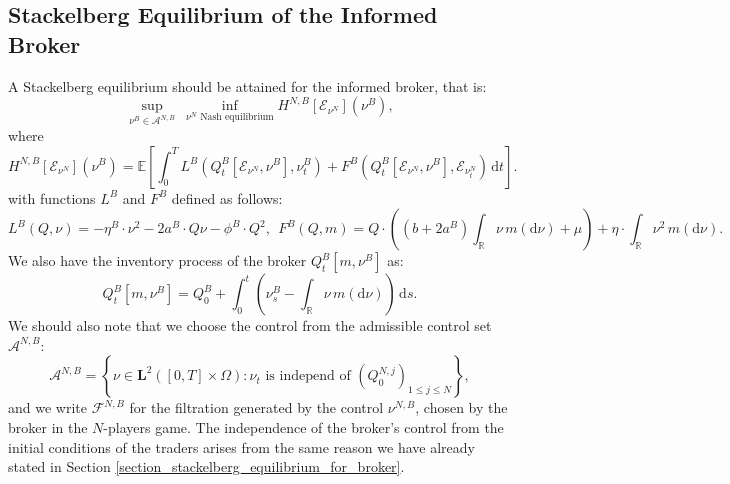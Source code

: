 \documentclass[10pt]{article}
\begin{document}
\subsection{Stackelberg Equilibrium of the Informed Broker}\label{section: broker_finite_problem}
A Stackelberg equilibrium should be attained for the informed broker, that is:
\begin{equation}\label{lem.finite_problem_for_broker}
    \underset{\nu^B \in \mathcal{A}^{N,B}}{\sup} ~\underset{\nu^N \text{~Nash equilibrium}}{\inf} H^{N,B}\left[\mathcal{E}_{\nu^N}\right] \left(\nu^B\right),
\end{equation}
where
\begin{equation}\label{broker_obj_finite}
    H^{N,B}\left[\mathcal{E}_{\nu^N}\right]\left(\nu^B\right) = \mathbb{E} \left[ \int_0^T L^B(Q^B_t[\mathcal{E}_{\nu^N}, \nu^B], \nu^B_t) + F^B(Q^B_t[\mathcal{E}_{\nu^N}, \nu^B], \mathcal{E}_{\nu_t^N}) \, \mathrm{d}t \right].
\end{equation}
with functions $L^B$ and $F^B$ defined as follows:
\[
    L^B(Q, \nu) = - \eta^B \cdot \nu^2 - 2a^B \cdot Q \nu - \phi^B \cdot Q^2,~~
    F^B(Q, m) = Q \cdot \left( (b + 2a^B) \int_{\mathbb{R}} \nu \, m(\mathrm{d} \nu) + \mu\right) + \eta \cdot \int_{\mathbb{R}} \nu^2 \, m(\mathrm{d} \nu).
\]
We also have the inventory process of the broker $Q^B_t[m,\nu^B]$ as:
\[
    Q^B_t[m,\nu^B] = Q_0^B + \int_0^t \left( \nu_s^B - \int_{\mathbb{R}} \nu \, m(\mathrm{d}\nu) \right) \, \mathrm{d}s.
\]
We should also note that we choose the control from the admissible control set $\mathcal{A}^{N,B}$:
\[
    \mathcal{A}^{N,B} = \left\{ \nu \in \mathbf{L}^2([0,T] \times \Omega): \nu_t \text{ is independ of }(Q_0^{N,j})_{1\leq j \leq N} \right\},
\]
and we write \( \mathcal{F}^{N,B} \) for the filtration generated by the control \( \nu^{N,B} \), chosen by the broker in the \( N \)-players game. The independence of the broker's control from the initial conditions of the traders arises from the same reason we have already stated in Section \ref{section_stackelberg_equilibrium_for_broker}.\\
\end{document}
